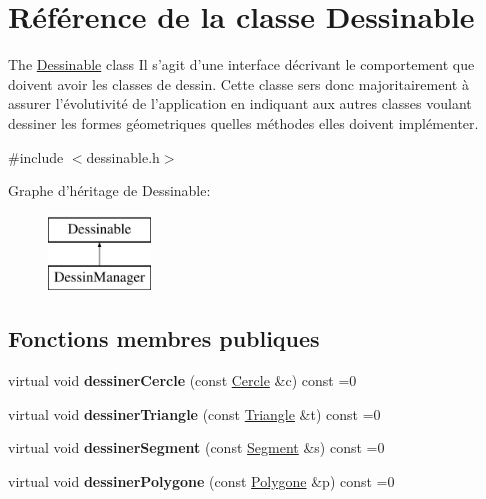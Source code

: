 \hypertarget{class_dessinable}{\section{Référence de la classe Dessinable}
\label{class_dessinable}
}


The \hyperlink{class_dessinable}{Dessinable} class Il s'agit d'une interface décrivant le comportement que doivent avoir les classes de dessin. Cette classe sers donc majoritairement à assurer l'évolutivité de l'application en indiquant aux autres classes voulant dessiner les formes géometriques quelles méthodes elles doivent implémenter.  




{\ttfamily \#include $<$dessinable.\+h$>$}

Graphe d'héritage de Dessinable\+:\begin{figure}[H]
\begin{center}
\leavevmode
\includegraphics[height=2.000000cm]{class_dessinable}
\end{center}
\end{figure}
\subsection*{Fonctions membres publiques}
\begin{DoxyCompactItemize}
\item 
\hypertarget{class_dessinable_a51d58a1596d60bdb8a4c0f45578031a5}{virtual void {\bfseries dessiner\+Cercle} (const \hyperlink{class_cercle}{Cercle} \&c) const =0}\label{class_dessinable_a51d58a1596d60bdb8a4c0f45578031a5}

\item 
\hypertarget{class_dessinable_a730da0dc2d1d4ec2d967641f4da0c9a8}{virtual void {\bfseries dessiner\+Triangle} (const \hyperlink{class_triangle}{Triangle} \&t) const =0}\label{class_dessinable_a730da0dc2d1d4ec2d967641f4da0c9a8}

\item 
\hypertarget{class_dessinable_a6afb4c5e0fd922cbc76c8e37ebc2e76b}{virtual void {\bfseries dessiner\+Segment} (const \hyperlink{class_segment}{Segment} \&s) const =0}\label{class_dessinable_a6afb4c5e0fd922cbc76c8e37ebc2e76b}

\item 
\hypertarget{class_dessinable_ab3c724ac2612e7aaf3bffb0819d2a38b}{virtual void {\bfseries dessiner\+Polygone} (const \hyperlink{class_polygone}{Polygone} \&p) const =0}\label{class_dessinable_ab3c724ac2612e7aaf3bffb0819d2a38b}

\end{DoxyCompactItemize}


